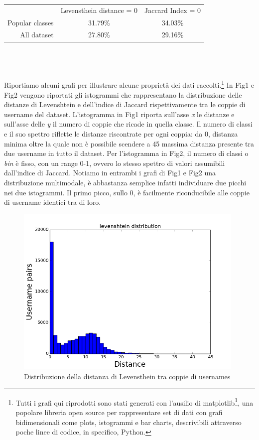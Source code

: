 \begin{tabular}{ r|c|c| }
\multicolumn{1}{r}{}
 &  \multicolumn{1}{c}{Levensthein distance = 0}
 & \multicolumn{1}{c}{Jaccard Index = 0 } \\
\cline{2-3}
Popular classes & 31.79\% & 34.03\% \\
\cline{2-3}
All dataset & 27.80\% & 29.16\% \\
\cline{2-3}
\end{tabular}
\\\\\\
Riportiamo alcuni grafi per illustrare alcune proprietå dei dati raccolti.\footnote{Tutti i grafi qui riprodotti sono stati generati con l’ausilio di matplotlib\footnote{http://matplotlib.org/}, una popolare libreria open source per rappresentare set di dati con grafi bidimensionali come plots, istogrammi e bar charts, descrivibili attraverso poche linee di codice, in specifico, Python.} In Fig1 e Fig2 vengono riportati gli istogrammi che rappresentano la distribuzione delle distanze di Levenshtein e dell'indice di Jaccard rispettivamente tra le coppie di username del dataset.
L'istogramma in Fig1 riporta sull'asse \textit{x} le distanze e sull'asse delle \textit{y} il numero di coppie che ricade in quella classe. Il numero di classi e il suo spettro riflette le distanze riscontrate per ogni coppia: da 0, distanza minima oltre la quale non è possibile scendere a 45 massima distanza presente tra due username in tutto il dataset. Per l'istogramma in Fig2, il numero di classi o \textit{bin} è fisso, con un range 0-1, ovvero lo stesso spettro di valori assumibili dall'indice di Jaccard.
Notiamo in entrambi i grafi di Fig1 e Fig2 una distribuzione multimodale, è abbastanza semplice infatti individuare due picchi nei due istogrammi. Il primo picco, sullo 0, è facilmente riconducibile alle coppie di username identici tra di loro.

\begin{figure}[h!]
\centering
\includegraphics[width=110mm]{chapters/distanceplot/levenshtein_distribution.png}
\caption{Distribuzione della distanza di Levensthein tra coppie di usernames  \label{overflow}}
\end{figure}

